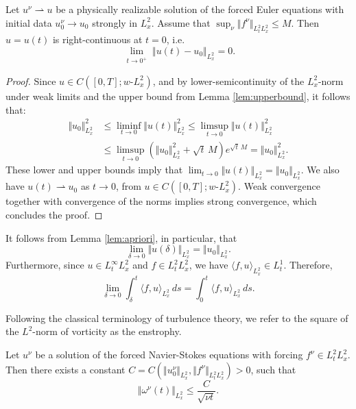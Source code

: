 \documentclass[reqno,12pt]{amsart}
\begin{document}
\begin{lemma}
\label{lem:apriori}
Let $u^\nu \rightharpoonup u$ be a physically realizable solution of the forced Euler equations with initial data $u_0^\nu\to u_0$ strongly in $L^2_x$. Assume that $\sup_{\nu} \Vert f^\nu \Vert_{L^2_tL^2_x} \le M$. Then $u=u(t)$ is right-continuous at $t=0$, i.e.
\[
\lim_{\substack{t\to 0^+}} \Vert u(t) - u_0 \Vert_{L^2_x} = 0.
\]
\end{lemma}



\begin{proof}
Since $u\in C([0,T];w\text{-}L^2_x)$, and by lower-semicontinuity of the $L^2_x$-norm under weak limits and the upper bound from Lemma \ref{lem:upperbound}, it follows that:
\begin{align*}
\Vert u_0 \Vert_{L^2_x}^2
&\le
\liminf_{t\to 0} \Vert u(t) \Vert_{L^2_x}^2
\le
\limsup_{t\to 0} \Vert u(t) \Vert_{L^2_x}^2
\\
&\le
\limsup_{t\to 0} \left(
\Vert u_0 \Vert_{L^2_x}^2
+
\sqrt{t} \, M
\right)
e^{\sqrt{t} \, M }
=
\Vert u_0 \Vert_{L^2_x}^2.
\end{align*}
These lower and upper bounds imply that $\lim_{t\to 0} \Vert u(t) \Vert_{L^2_x} = \Vert u_0 \Vert_{L^2_x}$.
We also have $u(t) \rightharpoonup u_0$ as $t\to 0$, from $u \in C([0,T];w\text{-}L^2_x)$.
Weak convergence together with convergence of the norms implies strong convergence, which concludes the proof.
\end{proof}

\begin{remark} \label{eq:ucont}
It follows from Lemma \ref{lem:apriori}, in particular, that
\begin{equation} \label{eq:inencont}
\lim_{\delta \to 0}
\Vert u(\delta) \Vert_{L^2_x}
=
\Vert u_0 \Vert_{L^2_x}.
\end{equation}
Furthermore, since $u \in L^\infty_t L^2_x$ and $f \in L^2_t L^2_x$, we have $\langle f, u \rangle_{L^2_x} \in L^1_t$. Therefore,
\begin{equation} \label{eq:fucont}
\lim_{\delta \to 0} \int_\delta^t \langle f, u \rangle_{L^2_x} \, ds =
\int_0^t \langle f, u \rangle_{L^2_x} \, ds.
\end{equation}
\end{remark}


Following the classical terminology of turbulence theory, we refer to the square of the $L^2$-norm of vorticity as the enstrophy.

\begin{lemma}
\label{lem:vort-bd}
Let $u^\nu$ be a solution of the forced Navier-Stokes equations with forcing $f^\nu \in L^2_tL^2_x$. Then there exists a constant $C = C(\Vert u^\nu_0 \Vert_{L^2_x},\Vert f^\nu \Vert_{L^2_tL^2_x})>0$, such that
  \[
  \Vert \omega^\nu(t) \Vert_{L^2_x} \le \frac{C}{\sqrt{\nu t}}.
  \]
\end{lemma}
\end{document}
